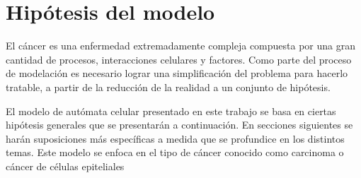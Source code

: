 \section{Hip\'otesis del modelo}
\label{subsec-hipo}
El c\'ancer es una enfermedad extremadamente compleja compuesta por una gran cantidad de procesos, interacciones celulares y factores. Como parte del proceso de modelación es necesario lograr una simplificación del problema para hacerlo tratable, a partir de la reducción de la realidad a un conjunto de hipótesis.

El modelo de autómata celular presentado en este trabajo se basa en ciertas hipótesis generales que se presentarán a continuación. En secciones siguientes se harán suposiciones más específicas a medida que se profundice en los distintos temas. Este modelo se enfoca en el tipo de cáncer conocido como carcinoma o cáncer de células epiteliales

